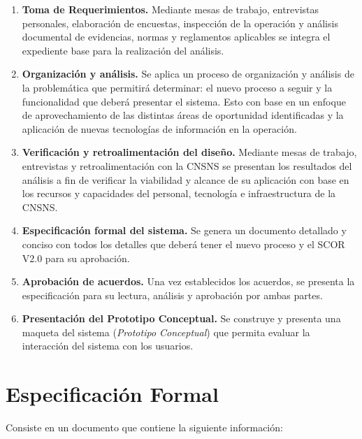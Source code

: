 \documentclass[10pt]{book}
\begin{document}
	
\begin{enumerate}
	\item {\bf Toma de Requerimientos.} Mediante mesas de trabajo, entrevistas personales, elaboración de encuestas, inspección de la operación y análisis documental de evidencias, normas y reglamentos aplicables se integra el expediente base para la realización del análisis.
	\item {\bf Organización y análisis.} Se aplica un proceso de organización y análisis de la problemática que permitirá determinar: el nuevo proceso a seguir y la funcionalidad que deberá presentar el sistema. Esto con base en un enfoque de aprovechamiento de las distintas áreas de oportunidad identificadas y la aplicación de nuevas tecnologías de información en la operación.
	\item {\bf Verificación y retroalimentación del diseño.} Mediante mesas de trabajo, entrevistas y retroalimentación con la CNSNS se presentan los resultados del análisis a fin de verificar la viabilidad y alcance de su aplicación con base en los recursos y capacidades del personal, tecnología e infraestructura de la CNSNS.
	\item {\bf Especificación formal del sistema.} Se genera un documento detallado y conciso con todos los detalles que deberá tener el nuevo proceso y el SCOR V2.0 para su aprobación.  
	\item {\bf Aprobación de acuerdos.} Una vez establecidos los acuerdos, se presenta la especificación para su lectura, análisis y aprobación por ambas partes.
	\item {\bf Presentación del Prototipo Conceptual.} Se construye y presenta una maqueta del sistema ({\em Prototipo Conceptual}) que permita evaluar la interacción del sistema con los usuarios.
\end{enumerate}

\section{Especificación Formal}

	Consiste en un documento que contiene la siguiente información:
	
\end{document}
